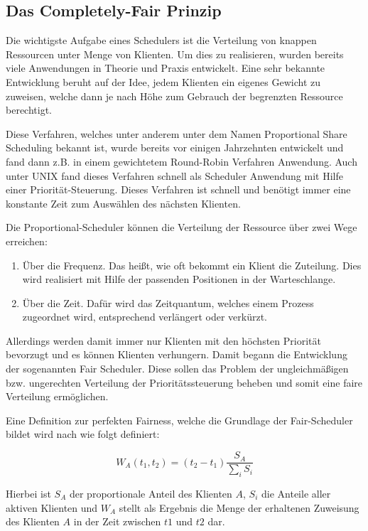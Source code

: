 \subsection{Das \glqq Completely-Fair\grqq{} Prinzip}\label{s:fair}
Die wichtigste Aufgabe eines Schedulers ist die Verteilung von knappen Ressourcen unter Menge von Klienten. 
Um dies zu realisieren, wurden bereits viele Anwendungen in Theorie und Praxis entwickelt.
Eine sehr bekannte Entwicklung beruht auf der Idee, jedem Klienten ein eigenes Gewicht zu zuweisen, welche dann je nach Höhe zum Gebrauch der begrenzten Ressource berechtigt.

Diese Verfahren, welches unter anderem unter dem Namen \glqq Proportional Share Scheduling\grqq{} bekannt ist, wurde bereits vor einigen Jahrzehnten entwickelt und fand dann z.B. in einem gewichtetem Round-Robin Verfahren Anwendung. Auch unter UNIX fand dieses Verfahren schnell als Scheduler Anwendung mit Hilfe einer Priorität-Steuerung. Dieses Verfahren ist schnell und benötigt immer eine konstante Zeit zum Auswählen des nächsten Klienten. 

Die Proportional-Scheduler können die Verteilung der Ressource über zwei Wege erreichen:

\begin{enumerate}
	\item Über die Frequenz. Das heißt, wie oft bekommt ein Klient die Zuteilung. Dies wird realisiert mit Hilfe der passenden Positionen in der Warteschlange.
	\item Über die Zeit. Dafür wird das Zeitquantum, welches einem Prozess zugeordnet wird, entsprechend verlängert oder verkürzt.
\end{enumerate}

Allerdings werden damit immer nur Klienten mit den höchsten Priorität bevorzugt und es können Klienten \glqq verhungern\grqq{}.
Damit begann die Entwicklung der sogenannten \glqq Fair Scheduler\grqq{}. Diese sollen das Problem der ungleichmäßigen bzw. ungerechten Verteilung der Prioritätssteuerung beheben und somit eine \glqq faire\grqq{} Verteilung ermöglichen. 

Eine Definition zur perfekten Fairness, welche die Grundlage der Fair-Scheduler bildet wird nach \cite{pdf Frau Ma} wie folgt definiert:

\begin{equation}
W_A(t_1,t_2) = (t_2 - t_1) \frac{S_A}{\sum_i S_i}
\label{eq:perfect_fairness}
\end{equation}

Hierbei ist $S_A$ der proportionale Anteil des Klienten $A$, $S_i$ die Anteile aller aktiven Klienten und $W_A$ stellt als Ergebnis die Menge der erhaltenen Zuweisung des Klienten $A$ in der Zeit zwischen $t1$ und $t2$ dar.

